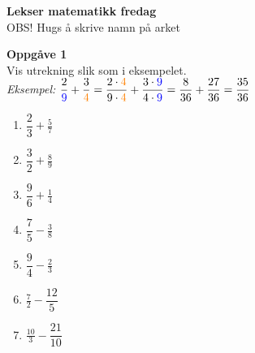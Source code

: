 \documentclass[english,hidelinks,pdftex, 11 pt, class=report,crop=false]{standalone}
\begin{document}
\newpage	
\huge \textbf{Lekser matematikk fredag}\\
\footnotesize OBS! Hugs å skrive namn på arket \\[25pt]
\large

{\Large \textbf{Oppgåve 1}}\\[10pt]
Vis utrekning slik som i eksempelet. \\[10pt]
\textit{Eksempel:} $ \displaystyle
\frac{2}{\color{blue}9}+\frac{3}{\color{orange}4}=\frac{2\cdot \color{orange}4}{9\cdot\color{orange}4}+\frac{3\cdot\color{blue}9}{4\cdot\color{blue}9}=\frac{8}{36}+\frac{27}{36}=\frac{35}{36}$ \\[10pt]
\begin{enumerate}[label=\alph*)]
	\item $\displaystyle \dfrac{2}{3}+\frac{5}{7} $\\[15pt]
	\item $\displaystyle \dfrac{3}{2}+\frac{8}{9}$\\[15pt]
	\item $\displaystyle \dfrac{9}{6}+\frac{1}{4} $\\[15pt]
	\item $\displaystyle \dfrac{7}{5}-\frac{3}{8} $\\[15pt]	
	\item $\displaystyle \dfrac{9}{4}-\frac{2}{3} $\\[15pt]
	\item $\displaystyle \frac{7}{2}-\dfrac{12}{5} $\\[15pt]	
	\item $\displaystyle \frac{10}{3}-\dfrac{21}{10} $\\[15pt]		
\end{enumerate}
\end{document}
